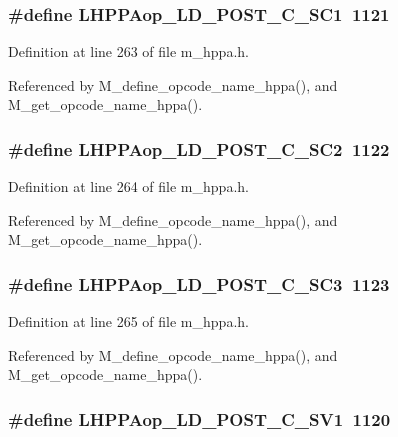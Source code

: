 \subsubsection{\setlength{\rightskip}{0pt plus 5cm}\#define LHPPAop\_\-LD\_\-POST\_\-C\_\-SC1~1121}\label{m__hppa_8h_302f483f1703678b19f1c92b79aaf072}




Definition at line 263 of file m\_\-hppa.h.

Referenced by M\_\-define\_\-opcode\_\-name\_\-hppa(), and M\_\-get\_\-opcode\_\-name\_\-hppa().
\subsubsection{\setlength{\rightskip}{0pt plus 5cm}\#define LHPPAop\_\-LD\_\-POST\_\-C\_\-SC2~1122}\label{m__hppa_8h_148b5a29c60ddd2ca3a3aed9918d457a}




Definition at line 264 of file m\_\-hppa.h.

Referenced by M\_\-define\_\-opcode\_\-name\_\-hppa(), and M\_\-get\_\-opcode\_\-name\_\-hppa().
\subsubsection{\setlength{\rightskip}{0pt plus 5cm}\#define LHPPAop\_\-LD\_\-POST\_\-C\_\-SC3~1123}\label{m__hppa_8h_b74c99c7c6de69521cba01bc08c3ce67}




Definition at line 265 of file m\_\-hppa.h.

Referenced by M\_\-define\_\-opcode\_\-name\_\-hppa(), and M\_\-get\_\-opcode\_\-name\_\-hppa().
\subsubsection{\setlength{\rightskip}{0pt plus 5cm}\#define LHPPAop\_\-LD\_\-POST\_\-C\_\-SV1~1120}\label{m__hppa_8h_6ee5a20ca1fee5327a5063084922a786}




